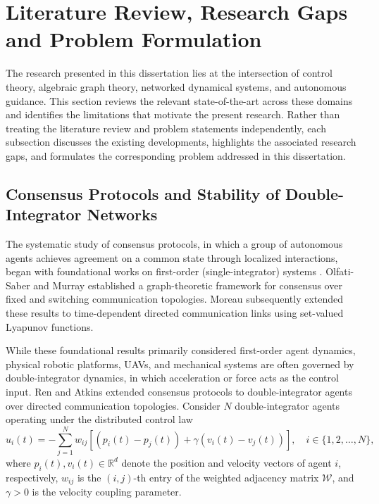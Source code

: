 \section{Literature Review, Research Gaps and Problem Formulation} \label{sec:literature_review}

The research presented in this dissertation lies at the intersection of control theory, algebraic graph theory, networked dynamical systems, and autonomous guidance. This section reviews the relevant state-of-the-art across these domains and identifies the limitations that motivate the present research. Rather than treating the literature review and problem statements independently, each subsection discusses the existing developments, highlights the associated research gaps, and formulates the corresponding problem addressed in this dissertation.

\subsection{Consensus Protocols and Stability of Double-Integrator Networks}
\label{subsec:second_order_consensus}

The systematic study of consensus protocols, in which a group of autonomous agents achieves agreement on a common state through localized interactions, began with foundational works on first-order (single-integrator) systems \cite{saber2003consensus, jadbabaie2003coordination, fax2004information, 1333204}. Olfati-Saber and Murray \cite{saber2003consensus} established a graph-theoretic framework for consensus over fixed and switching communication topologies. Moreau \cite{moreau2005stability} subsequently extended these results to time-dependent directed communication links using set-valued Lyapunov functions.

While these foundational results primarily considered first-order agent dynamics, physical robotic platforms, UAVs, and mechanical systems are often governed by double-integrator dynamics, in which acceleration or force acts as the control input. Ren and Atkins \cite{ren2005second} extended consensus protocols to double-integrator agents over directed communication topologies. Consider $N$ double-integrator agents operating under the distributed control law
\begin{equation}
\label{eq:agent-wise}
    u_i(t) = -\sum_{j=1}^{N} w_{ij}
    \left[
    (p_i(t)-p_j(t))+
    \gamma(v_i(t)-v_j(t))
    \right],
    \quad i\in\{1,2,\ldots,N\},
\end{equation}
where $p_i(t),v_i(t)\in\mathbb{R}^d$ denote the position and velocity vectors of agent $i$, respectively, $w_{ij}$ is the $(i,j)$-th entry of the weighted adjacency matrix $\mathcal{W}$, and $\gamma>0$ is the velocity coupling parameter.

